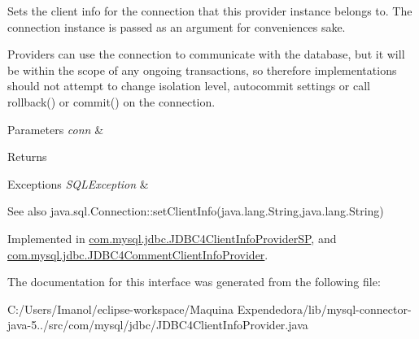 Sets the client info for the connection that this provider instance belongs to. The connection instance is passed as an argument for convenience\textquotesingle{}s sake.

Providers can use the connection to communicate with the database, but it will be within the scope of any ongoing transactions, so therefore implementations should not attempt to change isolation level, autocommit settings or call rollback() or commit() on the connection.


\begin{DoxyParams}{Parameters}
{\em conn} & \\
\hline
\end{DoxyParams}
\begin{DoxyReturn}{Returns}

\end{DoxyReturn}

\begin{DoxyExceptions}{Exceptions}
{\em S\+Q\+L\+Exception} & \\
\hline
\end{DoxyExceptions}
\begin{DoxySeeAlso}{See also}
java.\+sql.\+Connection\+::set\+Client\+Info(java.\+lang.\+String,java.\+lang.\+String) 
\end{DoxySeeAlso}


Implemented in \mbox{\hyperlink{classcom_1_1mysql_1_1jdbc_1_1_j_d_b_c4_client_info_provider_s_p_afc850b09b440756a3a5ecc69b8745ce4}{com.\+mysql.\+jdbc.\+J\+D\+B\+C4\+Client\+Info\+Provider\+SP}}, and \mbox{\hyperlink{classcom_1_1mysql_1_1jdbc_1_1_j_d_b_c4_comment_client_info_provider_a00f16e37481cbadcf8b5d8e6267cd54a}{com.\+mysql.\+jdbc.\+J\+D\+B\+C4\+Comment\+Client\+Info\+Provider}}.



The documentation for this interface was generated from the following file\+:\begin{DoxyCompactItemize}
\item 
C\+:/\+Users/\+Imanol/eclipse-\/workspace/\+Maquina Expendedora/lib/mysql-\/connector-\/java-\/5../src/com/mysql/jdbc/J\+D\+B\+C4\+Client\+Info\+Provider.\+java\end{DoxyCompactItemize}
